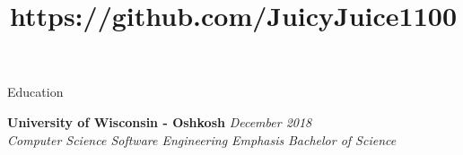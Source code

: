 \documentclass{resume} %
\title{https://github.com/JuicyJuice1100}
\begin{document}

\begin{rSection}{Education}

{\bf University of Wisconsin - Oshkosh} \hfill {\em December 2018} \\
{\em Computer Science \seperator Software Engineering Emphasis} \hfill {\em Bachelor of Science}

\end{rSection}

\end{document}
